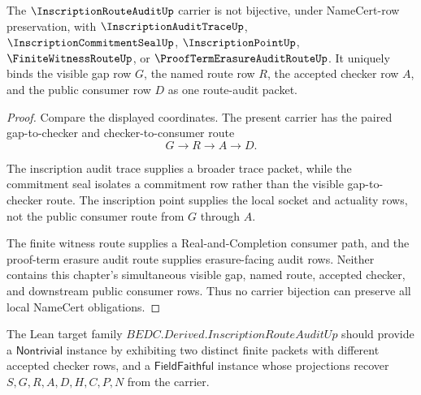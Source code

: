 \begin{theorem}
\label{thm:inscription-route-audit-independence-witness}
The $\InscriptionRouteAuditUp$ carrier is not bijective, under NameCert-row
preservation, with $\InscriptionAuditTraceUp$, $\InscriptionCommitmentSealUp$,
$\InscriptionPointUp$, $\FiniteWitnessRouteUp$, or
$\ProofTermErasureAuditRouteUp$. It uniquely binds the visible gap row $G$,
the named route row $R$, the accepted checker row $A$, and the public consumer
row $D$ as one route-audit packet.
\end{theorem}
\begin{proof}
Compare the displayed coordinates. The present carrier has the paired
gap-to-checker and checker-to-consumer route
$$
G \to R \to A \to D.
$$

The inscription audit trace supplies a broader trace packet, while the
commitment seal isolates a commitment row rather than the visible
gap-to-checker route. The inscription point supplies the local socket and
actuality rows, not the public consumer route from $G$ through $A$.

The finite witness route supplies a Real-and-Completion consumer path, and the
proof-term erasure audit route supplies erasure-facing audit rows. Neither
contains this chapter's simultaneous visible gap, named route, accepted
checker, and downstream public consumer rows. Thus no carrier bijection can
preserve all local NameCert obligations.
\end{proof}

The Lean target family $BEDC.Derived.InscriptionRouteAuditUp$ should provide a
$\mathsf{Nontrivial}$ instance by exhibiting two distinct finite packets with
different accepted checker rows, and a $\mathsf{FieldFaithful}$ instance whose
projections recover $S,G,R,A,D,H,C,P,N$ from the carrier.

